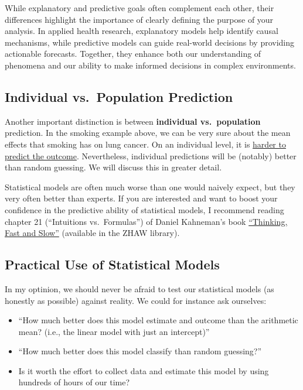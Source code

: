 \documentclass[
]{book}
\begin{document}
While explanatory and predictive goals often complement each other,
their differences highlight the importance of clearly defining the purpose
of your analysis. In applied health research, explanatory models help identify
causal mechanisms, while predictive models can guide real-world decisions by
providing actionable forecasts. Together, they enhance both our understanding
of phenomena and our ability to make informed decisions in complex environments.

\subsection{Individual vs.~Population Prediction}\label{individual-vs.-population-prediction}

Another important distinction is between \textbf{individual vs.~population} prediction.
In the smoking example above, we can be very sure about the mean effects that smoking has on lung cancer.
On an individual level, it is \href{https://www.liebertpub.com/doi/10.1089/rej.2019.2298}{harder to predict the outcome}.
Nevertheless, individual predictions will be (notably) better than random guessing. We will discuss this in greater detail.

Statistical models are often much worse than one would naively expect, but
they very often better than experts. If you are interested and want to
boost your confidence in the predictive ability of statistical models,
I recommend reading chapter 21 (``Intuitions vs.~Formulas'') of Daniel Kahneman's book
\href{https://en.wikipedia.org/wiki/Thinking,_Fast_and_Slow}{``Thinking, Fast and Slow''}
(available in the ZHAW library).

\subsection{Practical Use of Statistical Models}\label{practical-use-of-statistical-models}

In my optinion, we should never be afraid to test our statistical models (as honestly as possible) against reality.
We could for instance ask ourselves:

\begin{itemize}
\item
  ``How much better does this model estimate and outcome than the arithmetic mean?
  (i.e., the linear model with just an intercept)''
\item
  ``How much better does this model classify than random guessing?''
\item
  Is it worth the effort to collect data and estimate this model by using hundreds of hours of our time?
\end{itemize}
\end{document}
